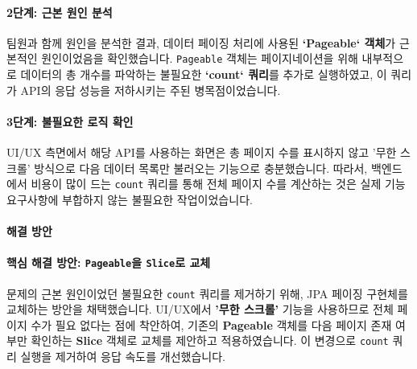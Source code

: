 \documentclass[12pt,a4paper]{article}
\begin{document}
    \vspace{1em}


    \paragraph{2단계: 근본 원인 분석} \par
    팀원과 함께 원인을 분석한 결과, 데이터 페이징 처리에 사용된 \textbf{`Pageable` 객체}가 근본적인 원인이었음을 확인했습니다. \texttt{Pageable} 객체는 페이지네이션을 위해 내부적으로 데이터의 총 개수를 파악하는 불필요한 \textbf{`count` 쿼리}를 추가로 실행하였고, 이 쿼리가 API의 응답 성능을 저하시키는 주된 병목점이었습니다.\\

    \vspace{1em}


    \paragraph{3단계: 불필요한 로직 확인} \par
    UI/UX 측면에서 해당 API를 사용하는 화면은 총 페이지 수를 표시하지 않고 '무한 스크롤' 방식으로 다음 데이터 목록만 불러오는 기능으로 충분했습니다. 따라서, 백엔드에서 비용이 많이 드는 \texttt{count} 쿼리를 통해 전체 페이지 수를 계산하는 것은 실제 기능 요구사항에 부합하지 않는 불필요한 작업이었습니다.\\



    \paragraph{해결 방안}


    \paragraph{핵심 해결 방안: \texttt{Pageable}을 \texttt{Slice}로 교체} \par
    문제의 근본 원인이었던 불필요한 \texttt{count} 쿼리를 제거하기 위해, JPA 페이징 구현체를 교체하는 방안을 채택했습니다. UI/UX에서 \textbf{'무한 스크롤'} 기능을 사용하므로 전체 페이지 수가 필요 없다는 점에 착안하여, 기존의 \textbf{Pageable} 객체를 다음 페이지 존재 여부만 확인하는 \textbf{Slice} 객체로 교체를 제안하고 적용하였습니다. 이 변경으로 \texttt{count} 쿼리 실행을 제거하여 응답 속도를 개선했습니다.\\
\end{document}
